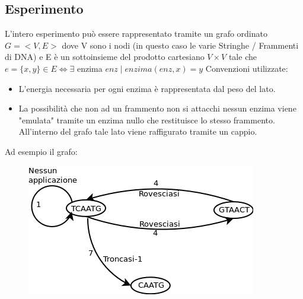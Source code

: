 \documentclass[a4paper,10pt]{article}
\begin{document}
\subsection{Esperimento}
L'intero esperimento può essere rappresentato tramite un grafo ordinato $G=<V,E>$ dove V sono i nodi (in questo caso le varie Stringhe / Frammenti di DNA) e E è un sottoinsieme del prodotto cartesiano $V\times V$ tale che $e = \{x,y\} \in E \iff \exists$ enzima $enz \mid enzima(enz,x)=y$
Convenzioni utilizzate: \begin{itemize}
\item L'energia necessaria per ogni enzima è rappresentata dal peso del lato. \item La possibilità che non ad un frammento non si attacchi nessun enzima viene "emulata" tramite un enzima nullo che restituisce lo stesso frammento. All'interno del grafo tale lato viene raffigurato tramite un cappio.

\end{itemize}
Ad esempio il grafo: \begin{figure}[htop]
\centering\includegraphics[scale=0.5]{graph1.png}\end{figure}
\end{document}
